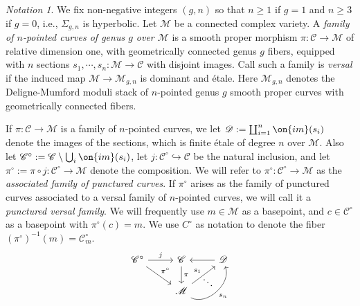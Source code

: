 \documentclass[12 pt]{amsart}
\theoremstyle{plain}
\theoremstyle{definition}
\theoremstyle{remark}
\newtheorem{notation}[subsubsection]{Notation}
\numberwithin{equation}{section}
\begin{document}
\begin{notation}
	\label{notation:versal-family}
	We fix non-negative integers $(g,n)$ so that $n \geq 1$ if $g = 1$ and
	$n \geq 3$ if $g = 0$, i.e., $\Sigma_{g,n}$ is hyperbolic.
	Let $\mathscr{M}$ be a connected complex variety. A \emph{family
	of $n$-pointed curves of genus $g$ over $\mathscr{M}$} is a smooth
	proper morphism $\pi: \mathscr{C}\to \mathscr{M}$ of relative dimension one, with geometrically
	connected genus $g$ fibers, equipped with $n$ sections $s_1,\cdots,
	s_n: \mathscr{M}\to \mathscr{C}$ with disjoint images. Call such a family is \emph{versal} if the
	induced map $\mathscr{M}\to \mathscr{M}_{g,n}$ is dominant and \'etale.
	Here $\mathscr M_{g,n}$ denotes the Deligne-Mumford moduli stack of $n$-pointed genus
	$g$ smooth proper curves with geometrically connected fibers.

	If $\pi: \mathscr{C}\to \mathscr{M}$ is a family of $n$-pointed curves, we let
	$\mathscr D := \coprod_{i=1}^n \on{im}(s_i)$ denote the images of
	the sections, which is finite \'etale of degree $n$ over $\mathscr M$.
	Also let
	$\mathscr{C}^\circ:=\mathscr{C}\setminus \bigcup_i \on{im}(s_i)$,
	let $j: \mathscr C^\circ \hookrightarrow \mathscr{C}$ be the natural
	inclusion, and let $\pi^\circ := \pi \circ j : \mathscr C^\circ \to \mathscr	M$ denote the composition. We will refer to $\pi^\circ: \mathscr{C}^\circ\to \mathscr{M}$ as the \emph{associated family of punctured curves}. If $\pi^\circ$ arises as the family of punctured curves associated to a versal family of $n$-pointed curves, we will call it a \emph{punctured versal family}.
	We will frequently use $m \in \mathscr M$ as a basepoint, and $c \in
	\mathscr C^\circ$ as a basepoint with $\pi^\circ(c) = m$.
	We use $C^\circ$ as notation to denote the fiber $(\pi^\circ)^{-1}(m) = \mathscr
	C^\circ_m$.
	\begin{equation}
		\label{equation:}
		\begin{tikzcd}
			\mathscr C^\circ \ar {r}{j} \ar {rd}{\pi^\circ} &
			\mathscr C \ar {d}{\pi} & \mathscr D \ar{l} \\
			& \mathscr M \ar{ur}{s_1} \ar[bend
			right=70,swap,ur,"s_n"]
			\arrow[bend right = 60, ur, draw=none, "\ddots"]
		 &
		\end{tikzcd}
	\end{equation}
\end{notation}

\end{document}
